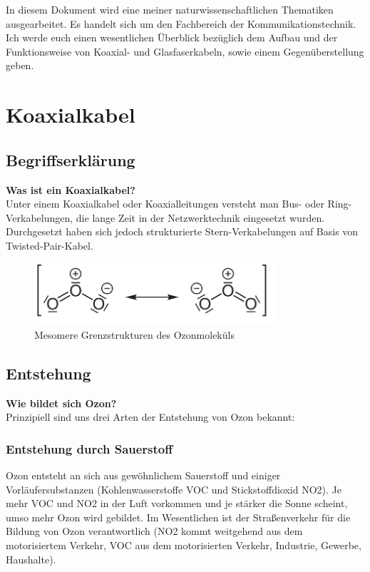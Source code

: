 \documentclass[11pt, a4paper]{article}
\begin{document}
In diesem Dokument wird eine meiner naturwissenschaftlichen Thematiken ausgearbeitet. Es handelt sich um den Fachbereich der Kommunikationstechnik. Ich werde euch einen wesentlichen Überblick bezüglich dem Aufbau und der Funktionsweise von Koaxial- und Glasfaserkabeln, sowie einem Gegenüberstellung geben.

\section{Koaxialkabel}

\subsection{Begriffserklärung}
\textbf{Was ist ein Koaxialkabel?}\\
Unter einem Koaxialkabel oder Koaxialleitungen versteht man Bus- oder Ring-Verkabelungen, die lange Zeit in der Netzwerktechnik eingesetzt wurden. Durchgesetzt haben sich jedoch strukturierte Stern-Verkabelungen auf Basis von Twisted-Pair-Kabel.\\

\begin{figure}[h!]
	\centering
	\includegraphics[width=0.8\textwidth]{images/ozon}
	\caption{Mesomere Grenzstrukturen des Ozonmoleküls}
\end{figure}

\subsection{Entstehung}
\textbf{Wie bildet sich Ozon?}\\
Prinzipiell sind uns drei Arten der Entstehung von Ozon bekannt:
\subsubsection{Entstehung durch Sauerstoff}
Ozon entsteht an sich aus gewöhnlichem Sauerstoff und einiger Vorläufersubstanzen (Kohlenwasserstoffe VOC und Stickstoffdioxid NO2). Je mehr VOC und NO2 in der Luft vorkommen und je stärker die Sonne scheint, umso mehr Ozon wird gebildet. Im Wesentlichen ist der Straßenverkehr für die Bildung von Ozon verantwortlich (NO2 kommt weitgehend aus dem motorisiertem Verkehr, VOC aus dem motorisierten Verkehr, Industrie, Gewerbe, Haushalte). 
\end{document}
